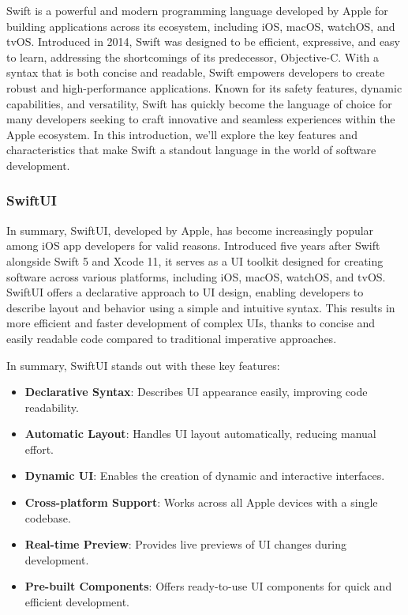 Swift is a powerful and modern programming language developed by Apple for building applications across its ecosystem, including iOS, macOS, watchOS, and tvOS. Introduced in 2014, Swift was designed to be efficient, expressive, and easy to learn, addressing the shortcomings of its predecessor, Objective-C. With a syntax that is both concise and readable, Swift empowers developers to create robust and high-performance applications. Known for its safety features, dynamic capabilities, and versatility, Swift has quickly become the language of choice for many developers seeking to craft innovative and seamless experiences within the Apple ecosystem. In this introduction, we'll explore the key features and characteristics that make Swift a standout language in the world of software development.

\subsubsection{SwiftUI}

In summary, SwiftUI, developed by Apple, has become increasingly popular among iOS app developers for valid reasons. Introduced five years after Swift alongside Swift 5 and Xcode 11, it serves as a UI toolkit designed for creating software across various platforms, including iOS, macOS, watchOS, and tvOS. SwiftUI offers a declarative approach to UI design, enabling developers to describe layout and behavior using a simple and intuitive syntax. This results in more efficient and faster development of complex UIs, thanks to concise and easily readable code compared to traditional imperative approaches.

In summary, SwiftUI stands out with these key features:

\begin{itemize}
    \item \textbf{Declarative Syntax}: Describes UI appearance easily, improving code readability.
    \item \textbf{Automatic Layout}: Handles UI layout automatically, reducing manual effort.
    \item \textbf{Dynamic UI}: Enables the creation of dynamic and interactive interfaces.
    \item \textbf{Cross-platform Support}: Works across all Apple devices with a single codebase.
    \item \textbf{Real-time Preview}: Provides live previews of UI changes during development.
    \item \textbf{Pre-built Components}: Offers ready-to-use UI components for quick and efficient development.
\end{itemize}

